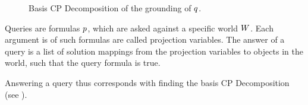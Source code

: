 \begin{figure}[h]
\begin{center}
	
\end{center}
\caption{Basis CP Decomposition of the grounding of $q$.}
	\label{fig:groundingCP}
\end{figure}





%
%
%
%
%




Queries are formulas $p$, which are asked against a specific world $W$.
Each argument is of such formulas are called projection variables.
The answer of a query is a list of solution mappings from the projection variables to objects in the world, such that the query formula is true.

Answering a query thus corresponds with finding the basis CP Decomposition (see ).

